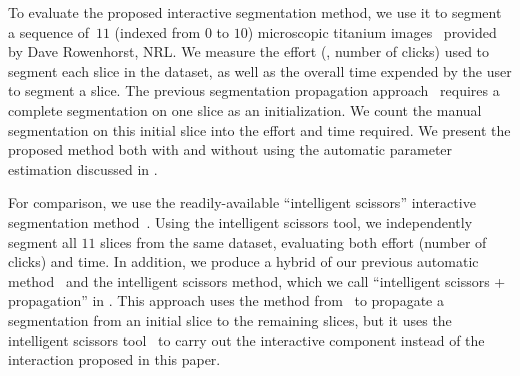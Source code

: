 \documentclass[]{spie}  %
\begin{document}
To evaluate the proposed interactive segmentation method, we use it to
segment a sequence of~$11$ (indexed from $0$ to $10$) microscopic
titanium images~\cite{rowenhorst:10} provided by Dave Rowenhorst, NRL.
We measure the effort (\ie, number of clicks) used to segment each
slice in the dataset, as well as the overall time expended by the user
to segment a slice.  The previous segmentation propagation
approach~\cite{waggoner:11} requires a complete segmentation on one
slice as an initialization.  We count the manual segmentation on this
initial slice into the effort and time required.  We present the
proposed method both with and without using the automatic parameter
estimation discussed in .

For comparison, we use the readily-available ``intelligent scissors''
interactive segmentation method~\cite{mortensen:95}.  Using the
intelligent scissors tool, we independently segment all $11$ slices
from the same dataset, evaluating both effort (number of clicks) and
time.  In addition, we produce a hybrid of our previous automatic
method~\cite{waggoner:11} and the intelligent scissors method, which
we call ``intelligent scissors + propagation'' in .  This
approach uses the method from~\cite{waggoner:11} to propagate a
segmentation from an initial slice to the remaining slices, but it
uses the intelligent scissors tool~\cite{mortensen:95} to carry out
the interactive component instead of the interaction proposed in this
paper.
\end{document}
